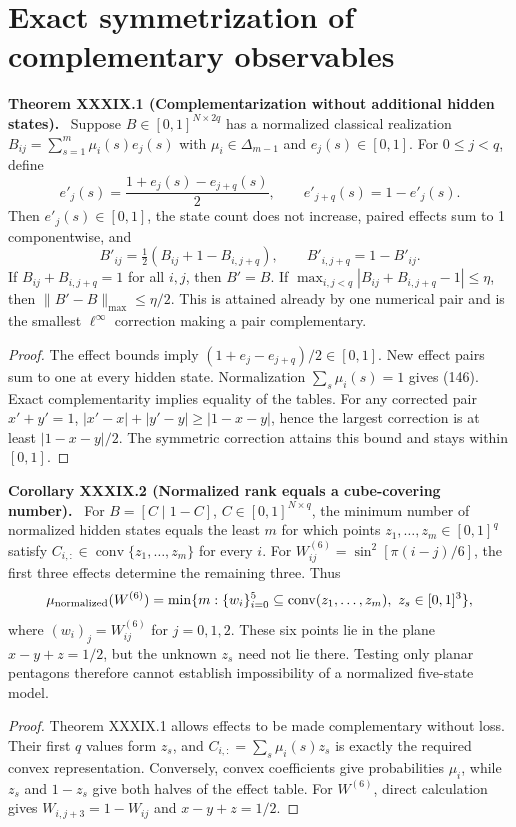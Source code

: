 \documentclass[11pt,a4paper,oneside]{book}
\newcommand{\statement}[3]{\par\medskip\noindent\textbf{#1 #2 (#3).}\ }
\begin{document}
\section{Exact symmetrization of complementary observables}
\statement{Theorem}{XXXIX.1}{Complementarization without additional hidden states}
Suppose $B\in[0,1]^{N\times2q}$ has a normalized classical realization $B_{ij}=\sum_{s=1}^m\mu_i(s)e_j(s)$ with $\mu_i\in\Delta_{m-1}$ and $e_j(s)\in[0,1]$. For $0\le j<q$, define
\[e'_j(s)=\frac{1+e_j(s)-e_{j+q}(s)}2,\qquad e'_{j+q}(s)=1-e'_j(s).\]
Then $e'_j(s)\in[0,1]$, the state count does not increase, paired effects sum to 1 componentwise, and
\begin{equation}B'_{ij}=\tfrac12(B_{ij}+1-B_{i,j+q}),\qquad B'_{i,j+q}=1-B'_{ij}.\tag{146}\end{equation}
If $B_{ij}+B_{i,j+q}=1$ for all $i,j$, then $B'=B$. If $\max_{i,j<q}|B_{ij}+B_{i,j+q}-1|\le\eta$, then $\|B'-B\|_{\max}\le\eta/2$. This is attained already by one numerical pair and is the smallest $\ell^\infty$ correction making a pair complementary.
\begin{proof}
The effect bounds imply $(1+e_j-e_{j+q})/2\in[0,1]$. New effect pairs sum to one at every hidden state. Normalization $\sum_s\mu_i(s)=1$ gives (146). Exact complementarity implies equality of the tables. For any corrected pair $x'+y'=1$, $|x'-x|+|y'-y|\ge|1-x-y|$, hence the largest correction is at least $|1-x-y|/2$. The symmetric correction attains this bound and stays within $[0,1]$.
\end{proof}
\statement{Corollary}{XXXIX.2}{Normalized rank equals a cube-covering number}
For $B=[C\mid1-C]$, $C\in[0,1]^{N\times q}$, the minimum number of normalized hidden states equals the least $m$ for which points $z_1,\ldots,z_m\in[0,1]^q$ satisfy $C_{i,:}\in\operatorname{conv}\{z_1,\ldots,z_m\}$ for every $i$. For $W^{(6)}_{ij}=\sin^2[\pi(i-j)/6]$, the first three effects determine the remaining three. Thus
\[\mu_{\rm normalized}(W^{(6)})=\min\{m:\{w_i\}_{i=0}^5\subseteq\operatorname{conv}(z_1,\ldots,z_m),\ z_s\in[0,1]^3\},\]
where $(w_i)_j=W^{(6)}_{ij}$ for $j=0,1,2$. These six points lie in the plane $x-y+z=1/2$, but the unknown $z_s$ need not lie there. Testing only planar pentagons therefore cannot establish impossibility of a normalized five-state model.
\begin{proof}
Theorem XXXIX.1 allows effects to be made complementary without loss. Their first $q$ values form $z_s$, and $C_{i,:}=\sum_s\mu_i(s)z_s$ is exactly the required convex representation. Conversely, convex coefficients give probabilities $\mu_i$, while $z_s$ and $1-z_s$ give both halves of the effect table. For $W^{(6)}$, direct calculation gives $W_{i,j+3}=1-W_{ij}$ and $x-y+z=1/2$.
\end{proof}
\end{document}
